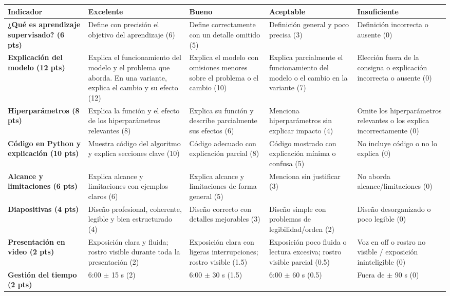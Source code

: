 \documentclass[a4,11pt]{aleph-notas}
\begin{document}
\begin{center}\footnotesize
\begin{tabular}{L{3cm}*{4}{L{2.9cm}}}
\toprule
\textbf{Indicador} & \textbf{Excelente} & \textbf{Bueno} & \textbf{Aceptable} & \textbf{Insuficiente} \\ \midrule

\textbf{¿Qué es aprendizaje supervisado? (6 pts)}
& Define con precisión el objetivo del aprendizaje (6)
& Define correctamente con un detalle omitido (5)
& Definición general y poco precisa (3)
& Definición incorrecta o ausente (0) \\ \midrule

\textbf{Explicación del modelo (12 pts)}
& Explica el funcionamiento del modelo y el problema que aborda. En una variante, explica el cambio y su efecto (12)
& Explica el modelo con omisiones menores sobre el problema o el cambio (10)
& Explica parcialmente el funcionamiento del modelo o el cambio en la variante (7)
& Elección fuera de la consigna o explicación incorrecta o ausente (0) \\ \midrule

\textbf{Hiperparámetros (8 pts)}
& Explica la función y el efecto de los hiperparámetros relevantes (8)
& Explica su función y describe parcialmente sus efectos (6)
& Menciona hiperparámetros sin explicar impacto (4)
& Omite los hiperparámetros relevantes o los explica incorrectamente (0) \\ \midrule

\textbf{Código en Python y explicación (10 pts)}
& Muestra código del algoritmo y explica secciones clave (10)
& Código adecuado con explicación parcial (8)
& Código mostrado con explicación mínima o confusa (5)
& No incluye código o no lo explica (0) \\ \midrule

\textbf{Alcance y limitaciones (6 pts)}
& Explica alcance y limitaciones con ejemplos claros (6)
& Explica alcance y limitaciones de forma general (5)
& Menciona sin justificar (3)
& No aborda alcance/limitaciones (0) \\ \midrule

\textbf{Diapositivas (4 pts)}
& Diseño profesional, coherente, legible y bien estructurado (4)
& Diseño correcto con detalles mejorables (3)
& Diseño simple con problemas de legibilidad/orden (2)
& Diseño desorganizado o poco legible (0) \\ \midrule

\textbf{Presentación en video (2 pts)}
& Exposición clara y fluida; rostro visible durante toda la presentación (2)
& Exposición clara con ligeras interrupciones; rostro visible (1.5)
& Exposición poco fluida o lectura excesiva; rostro visible parcial (0.5)
& Voz en off o rostro no visible / exposición ininteligible (0) \\ \midrule

\textbf{Gestión del tiempo (2 pts)}
& 6:00 $\pm$ 15 s (2)
& 6:00 $\pm$ 30 s (1.5)
& 6:00 $\pm$ 60 s (0.5)
& Fuera de $\pm$ 90 s (0) \\ \bottomrule

\end{tabular}
\end{center}
\end{document}
